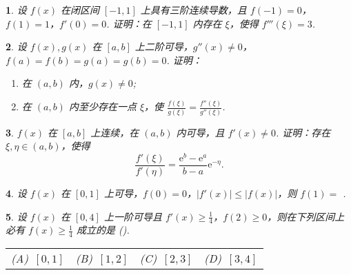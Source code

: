 \documentclass[openany,twocolumn]{ctexbook}
\makeatletter
\theoremstyle{change}
\newtheorem{ti}{}[section]
\newcommand{\hone}[1]{ \uline{\hspace{#1 pc}}}
\def\kuo{ (\hspace{1pc})}
\newcommand{\fourch}[4]{\noindent\begin{tabular}{*{4}{@{}p{1.97cm}}}(A)~#1 & (B)~#2 & (C)~#3 & (D)~#4\end{tabular}} %
\def\leq{\leqslant}
\def\geq{\geqslant}
\def\ee{\mathrm{e}}
\makeatother
\begin{document}
	\begin{ti}
		设 $f(x)$ 在闭区间 $[-1,1]$ 上具有三阶连续导数，且 $f(-1) = 0$，$f(1) = 1$，$f'(0) = 0$. 证明：在 $[-1,1]$ 内存在 $\xi$，使得 $f'''(\xi) = 3$.
	\end{ti}

	\begin{ti}
		设 $f(x), g(x)$ 在 $[a,b]$ 上二阶可导，$g''(x) \ne 0$，$f(a) = f(b) = g(a) = g(b) = 0$. 证明：
		\begin{enumerate}
			\item 在 $(a,b)$ 内，$g(x) \ne 0$;
			\item 在 $(a,b)$ 内至少存在一点 $\xi$，使 $\frac{f(\xi)}{g(\xi)} = \frac{f''(\xi)}{g''(\xi)}$.
		\end{enumerate}
	\end{ti}

	\begin{ti}
		$f(x)$ 在 $[a,b]$ 上连续，在 $(a,b)$ 内可导，且 $f'(x) \ne 0$. 证明：存在 $\xi, \eta \in (a,b)$，使得
		\[
			\frac{f'(\xi)}{f'(\eta)} = \frac{\ee^{b} - \ee^{a}}{b - a} \ee^{-\eta}.
		\]
	\end{ti}

	\begin{ti}
		设 $f(x)$ 在 $[0,1]$ 上可导，$f(0) = 0$，$\left| f'(x) \right| \leq \left| f(x) \right|$，则 $f(1) = $\hone{2}.
	\end{ti}

	\begin{ti}
		设 $f(x)$ 在 $[0,4]$ 上一阶可导且 $f'(x) \geq \frac{1}{4}$，$f(2) \geq 0$，则在下列区间上必有 $f(x) \geq \frac{1}{4}$ 成立的是\kuo.

		\fourch{$[0,1]$}{$[1,2]$}{$[2,3]$}{$[3,4]$}
	\end{ti}
\end{document}
